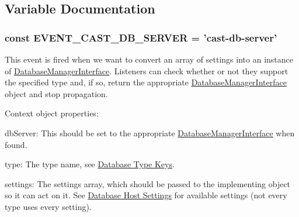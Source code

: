 \subsection{Variable Documentation}
\hypertarget{group__events_ga995abd83b9e56a165029cc26c24cdb13}{
\subsubsection[{E\-V\-E\-N\-T\-\_\-\-C\-A\-S\-T\-\_\-\-D\-B\-\_\-\-S\-E\-R\-V\-E\-R}]{\setlength{\rightskip}{0pt plus 5cm}const E\-V\-E\-N\-T\-\_\-\-C\-A\-S\-T\-\_\-\-D\-B\-\_\-\-S\-E\-R\-V\-E\-R = 'cast-\/db-\/server'}}\label{group__events_ga995abd83b9e56a165029cc26c24cdb13}
This event is fired when we want to convert an array of settings into an instance of \hyperlink{interfaceDatabaseManagerInterface}{Database\-Manager\-Interface}. Listeners can check whether or not they support the specified type and, if so, return the appropriate \hyperlink{interfaceDatabaseManagerInterface}{Database\-Manager\-Interface} object and stop propagation.

Context object properties\-:
\begin{DoxyItemize}
\item {\ttfamily db\-Server\-:} This should be set to the appropriate \hyperlink{interfaceDatabaseManagerInterface}{Database\-Manager\-Interface} when found.
\item {\ttfamily type\-:} The type name, see \hyperlink{group__db__types}{Database Type Keys}.
\item {\ttfamily settings\-:} The settings array, which should be passed to the implementing object so it can act on it. See \hyperlink{group__db__settings}{Database Host Settings} for available settings (not every type uses every setting).
\end{DoxyItemize}

